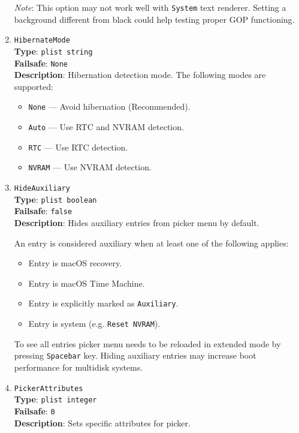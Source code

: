 \documentclass[]{article}
\providecommand{\tightlist}{%
  \setlength{\itemsep}{0pt}\setlength{\parskip}{0pt}}
\begin{document}
\begin{enumerate}
  \emph{Note}: This option may not work well with \texttt{System} text renderer.
  Setting a background different from black could help testing proper GOP functioning.

\item
  \texttt{HibernateMode}\\
  \textbf{Type}: \texttt{plist\ string}\\
  \textbf{Failsafe}: \texttt{None}\\
  \textbf{Description}: Hibernation detection mode. The following modes are supported:

  \begin{itemize}
  \tightlist
    \item \texttt{None} --- Avoid hibernation (Recommended).
    \item \texttt{Auto} --- Use RTC and NVRAM detection.
    \item \texttt{RTC} --- Use RTC detection.
    \item \texttt{NVRAM} --- Use NVRAM detection.
  \end{itemize}

\item
  \texttt{HideAuxiliary}\\
  \textbf{Type}: \texttt{plist\ boolean}\\
  \textbf{Failsafe}: \texttt{false}\\
  \textbf{Description}: Hides auxiliary entries from picker menu by default.

  An entry is considered auxiliary when at least one of the following applies:

  \begin{itemize}
  \tightlist
    \item Entry is macOS recovery.
    \item Entry is macOS Time Machine.
    \item Entry is explicitly marked as \texttt{Auxiliary}.
    \item Entry is system (e.g. \texttt{Reset NVRAM}).
  \end{itemize}

  To see all entries picker menu needs to be reloaded in extended mode by pressing
  \texttt{Spacebar} key. Hiding auxiliary entries may increase boot performance
  for multidisk systems.

\item
  \texttt{PickerAttributes}\\
  \textbf{Type}: \texttt{plist\ integer}\\
  \textbf{Failsafe}: \texttt{0}\\
  \textbf{Description}: Sets specific attributes for picker.


\end{enumerate}
\end{document}
